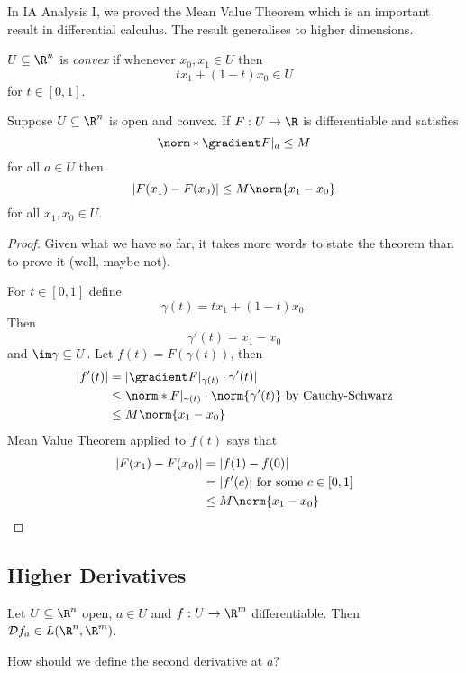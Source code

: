 \documentclass[a4paper]{article}
\newcommand*{\D}{\mathcal{D}}
\theoremstyle{definition}
\begin{document}
In IA Analysis I, we proved the Mean Value Theorem which is an important result in differential calculus. The result generalises to higher dimensions.

\begin{definition}
  \(U \subseteq \R^n\) is \emph{convex} if whenever \(x_0, x_1 \in U\) then
  \[
    tx_1 + (1 - t)x_0 \in U
  \]
  for \(t \in [0, 1]\).
\end{definition}

\begin{theorem}
  Suppose \(U \subseteq \R^n\) is open and convex. If \(F: U \to \R\) is differentiable and satisfies
  \[
    \norm*{\gradient F|_a} \leq M
  \]
  for all \(a \in U\) then
  \[
    |F(x_1) - F(x_0)| \leq M \norm{x_1 - x_0}
  \]
  for all \(x_1, x_0 \in U\).
\end{theorem}

\begin{proof}
  Given what we have so far, it takes more words to state the theorem than to prove it (well, maybe not).
  
  For \(t \in [0, 1]\) define
  \[
    \gamma(t) = t x_1 + (1 - t)x_0.
  \]
  Then
  \[
    \gamma'(t) = x_1 - x_0
  \]
  and \(\im \gamma \subseteq U\). Let \(f(t) = F(\gamma(t))\), then
  \begin{align*}
    |f'(t)| &= |\gradient F|_{\gamma(t)} \cdot \gamma'(t)| \\
            &\leq \norm*{F|_{\gamma(t)}} \cdot \norm{\gamma'(t)} \text{ by Cauchy-Schwarz} \\
            &\leq M \norm{x_1 -x_0}
  \end{align*}
  Mean Value Theorem applied to \(f(t)\) says that
  \begin{align*}
    |F(x_1)  - F(x_0)| &= |f(1) - f(0)| \\
                       &= |f'(c)| \text{ for some } c \in [0, 1] \\
                       &\leq M \norm{x_1 - x_0}
  \end{align*}
\end{proof}

\subsection{Higher Derivatives}

Let \(U \subseteq \R^n\) open, \(a \in U\) and \(f: U \to \R^m\) differentiable. Then \(\D f_a \in L(\R^n, \R^m)\).

\begin{question}
  How should we define the second derivative at \(a\)?
\end{question}
\end{document}

